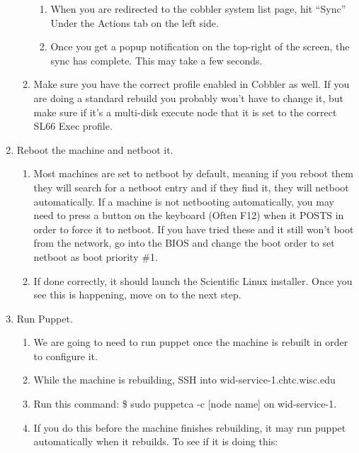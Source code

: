 \documentclass[10pt,letterpaper]{article}
\begin{document}
\begin{enumerate}
\begin{enumerate}
\begin{enumerate}
                \item When you are redirected to the cobbler system list page,
                hit “Sync” Under the Actions tab on the left side.
                \item Once you get a popup notification on the top-right of the
                screen, the sync has complete. This may take a few seconds.
            \end{enumerate}
            \item Make sure you have the correct profile enabled in Cobbler as
            well. If you are doing a standard rebuild you probably won’t have to
            change it, but make sure if it’s a multi-disk execute node that it is
            set to the correct SL66 Exec profile.
        \end{enumerate}
        \item Reboot the machine and netboot it.
        \begin{enumerate}
            \item Most machines are set to netboot by default, meaning if you
            reboot them they will search for a netboot entry and if they find it,
            they will netboot automatically. If a machine is not netbooting automatically,
            you may need to press a button on the keyboard (Often F12) when it POSTS
            in order to force it to netboot. If you have tried these and it still
            won’t boot from the network, go into the BIOS and change the boot order
            to set netboot as boot priority \#1.
            \item If done correctly, it should launch the Scientific Linux installer.
            Once you see this is happening, move on to the next step.
        \end{enumerate}
        \item Run Puppet.
        \begin{enumerate}
            \item We are going to need to run puppet once the machine is rebuilt
            in order to configure it.
            \item While the machine is rebuilding, SSH into wid-service-1.chtc.wisc.edu
            \item Run this command: {\selectfont \$ sudo puppetca
            -c [node name] } on wid-service-1.
            \item If you do this before the machine finishes rebuilding, it may
            run puppet automatically when it rebuilds. To see if it is doing this:

\end{enumerate}
\end{enumerate}
\end{document}
